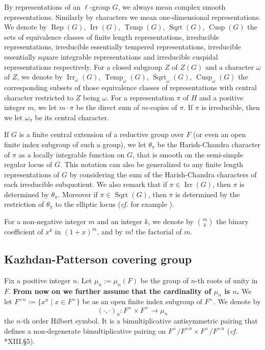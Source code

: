 \documentclass{amsart}
\numberwithin{equation}{section}
\newcommand{\mrirr}{\operatorname{Irr}}
\newcommand{\mrrep}{\operatorname{Rep}}
\newcommand{\mrcusp}{\operatorname{Cusp}}
\newcommand{\mrsqrt}{\operatorname{Sqrt}}
\newcommand{\mrtemp}{\operatorname{Temp}}
\begin{document}
	By representations of an $\ell$-group $G$, we always mean complex smooth representations. Similarly by characters we mean one-dimensional representations. We denote by $\mrrep(G)$, $\mrirr(G)$, $\mrtemp(G)$, $\mrsqrt(G)$, $\mrcusp(G)$ the sets of equivalence classes of finite length representations, irreducible representations, irreducible essentially tempered representations, irreducible essentially square integrable representations and irreducible cuspidal representations respectively. For a closed subgroup $Z$ of $Z(G)$ and a character $\omega$ of $Z$, we denote by $\mrirr_{\omega}(G)$, $\mrtemp_{\omega}(G)$, $\mrsqrt_{\omega}(G)$, $\mrcusp_{\omega}(G)$ the corresponding subsets
	of those equivalence classes of representations with central character restricted to $Z$ being $\omega$. For a representation $\pi$ of $H$ and a positive integer $m$, we let $m\cdot\pi$ be the direct sum of $m$-copies of $\pi$. If $\pi$ is irreducible, then we let $\omega_{\pi}$ be its central character. 
	
	If $G$ is a finite central extension of a reductive group over $F$ (or even an open finite index subgroup of such a group), we let $\theta_{\pi}$ be the Harish-Chandra character of $\pi$ as a locally integrable function on $G$, that is smooth on the semi-simple regular locus of $G$. This notation can also be generalized to any finite length representations of $G$ by considering the sum of the Harish-Chandra characters of each irreducible subquotient. We also remark that if $\pi\in\mrirr(G)$, then $\pi$ is determined by $\theta_{\pi}$. Moreover if $\pi\in\mrsqrt(G)$, then $\pi$ is determined by the restriction of $\theta_{\pi}$ to the elliptic locus (\emph{cf.} for example \cite{clozel1991invariant}).
	
	For a non-negative integer $m$ and an integer $k$, we denote by $\binom{m}{k}$ the binary coefficient of $x^{k}$ in $(1+x)^{m}$, and by $m!$ the factorial of $m$.
	
	\subsection{Kazhdan-Patterson covering group}\label{subsectionKPcover}
	
	Fix a positive integer $n$. Let $\mu_{n}:=\mu_{n}(F)$ be the group of $n$-th roots of unity in $F$. \textbf{From now on we further assume that the cardinality of $\mu_{n}$ is $n$.} We let $F^{\times n}:=\{x^{n}\mid x\in F^{\times}\}$ be as an open finite index subgroup of $F^{\times}$.
	We denote by 
	$$(\cdot,\cdot)_{n}:F^{\times}\times F^{\times}\rightarrow \mu_{n}$$ 
	the $n$-th order Hilbert symbol. It is a bimultiplicative antisymmetric pairing that
	defines a non-degenerate bimultiplicative pairing on $F^{\times}/F^{\times n}\times F^{\times}/F^{\times n}$ (\emph{cf.} \cite{weil1974basic}*{XIII.\S5}).
	
\end{document}
